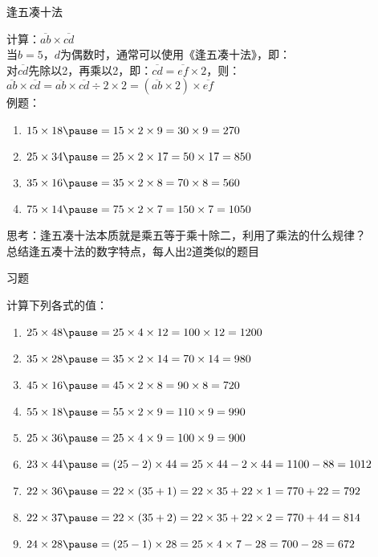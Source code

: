 \documentclass[aspectratio=169]{ctexbeamer} %
\date{\today}
\begin{document}
\begin{frame}[t]{逢五凑十法}
\begin{spacing}{1.2}
\normalsize
计算：$\overline{ab} \times \overline{cd}$ \\
当$b = 5$，$d$为偶数时，通常可以使用《逢五凑十法》，即：\\
对$\overline{cd}$先除以2，再乘以2，即：$\overline{cd} = \overline{ef} \times 2$，则：\\
$\overline{ab} \times \overline{cd} = \overline{ab} \times \overline{cd} \div 2 \times 2 = (\overline{ab} \times 2) \times \overline{ef} $ \\
例题：
\begin{enumerate}[label={\arabic*.}]
\item $15 \times 18 \pause = 15 \times 2 \times 9=30 \times 9 = 270$
\item $25 \times 34 \pause = 25 \times 2 \times 17=50 \times 17 = 850$
\item $35 \times 16 \pause = 35 \times 2 \times 8=70 \times 8 = 560$
\item $75 \times 14 \pause = 75 \times 2 \times 7=150 \times 7 = 1050$
\end{enumerate}
\alert{思考：逢五凑十法本质就是乘五等于乘十除二，利用了乘法的什么规律？} \\
\alert{总结逢五凑十法的数字特点，每人出2道类似的题目} \\
\end{spacing}
\end{frame}

\begin{frame}[t]{习题}
\begin{spacing}{1.2}
\normalsize
计算下列各式的值：
\begin{enumerate}[label={\arabic*.}]
\item $25 \times 48 \pause = 25 \times 4 \times 12 = 100 \times 12 = 1200$
\item $35 \times 28 \pause = 35 \times 2 \times 14 = 70 \times 14 = 980$
\item $45 \times 16 \pause = 45 \times 2 \times 8 = 90 \times 8 = 720$
\item $55 \times 18 \pause = 55 \times 2 \times 9 = 110 \times 9 = 990$
\item $25 \times 36 \pause = 25 \times 4 \times 9 = 100 \times 9 = 900$
\item $23 \times 44 \pause = (25 - 2) \times 44 = 25 \times 44 - 2 \times 44 = 1100 - 88 = 1012$
\item $22 \times 36 \pause = 22 \times (35+1) = 22 \times 35 + 22 \times 1 = 770 + 22 = 792$
\item $22 \times 37 \pause = 22 \times (35+2) = 22 \times 35 + 22 \times 2 = 770 + 44 = 814$
\item $24 \times 28 \pause = (25-1) \times 28 = 25 \times 4 \times 7 - 28 = 700 - 28 = 672$
\end{enumerate}

\end{spacing}
\end{frame}
\end{document}

